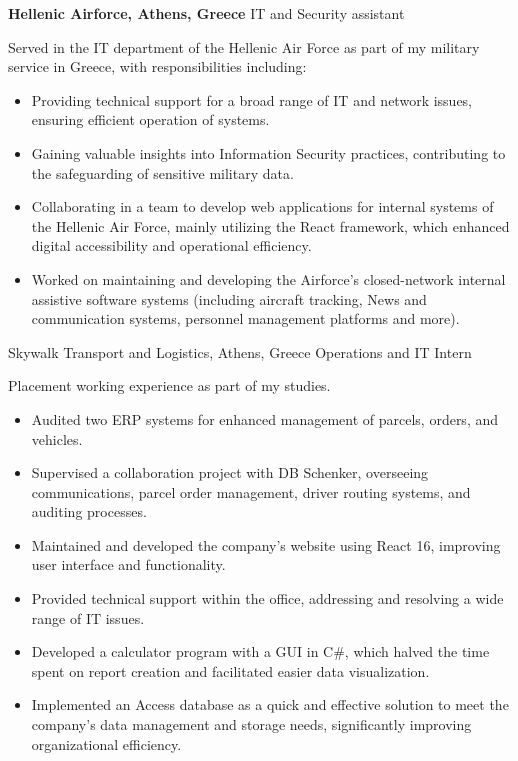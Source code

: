 {\textbf{Hellenic Airforce, Athens, Greece}}
{IT and Security assistant}
{
    Served in the IT department of the Hellenic Air Force as part of my military service in Greece, with
    responsibilities including:
    \begin{itemize}
        \item  Providing technical support for a broad range of IT and network issues, ensuring efficient operation of systems.
        \item Gaining valuable insights into Information Security practices, contributing to the safeguarding of sensitive military data.
        \item Collaborating in a team to develop web applications for internal systems of the Hellenic Air Force, mainly utilizing the React framework, which enhanced digital accessibility and operational efficiency.
        \item Worked on maintaining and developing the Airforce's closed-network internal assistive software systems (including aircraft tracking, News and communication systems, personnel management platforms and more).
    \end{itemize}
}

{Skywalk Transport and Logistics, Athens, Greece }
{Operations and IT Intern}
{

    Placement working experience as part of my studies.
    \begin{itemize}
        \item Audited two ERP systems for enhanced management of parcels, orders, and vehicles.
        \item Supervised a collaboration project with DB Schenker, overseeing communications, parcel order management, driver routing systems, and auditing processes.
        \item Maintained and developed the company's website using React 16, improving user interface and functionality.
        \item Provided technical support within the office, addressing and resolving a wide range of IT issues.
        \item Developed a calculator program with a GUI in C\#, which halved the time spent on report creation and facilitated easier data visualization.
        \item Implemented an Access database as a quick and effective solution to meet the company's data management and storage needs, significantly improving organizational efficiency.

    \end{itemize}
}

